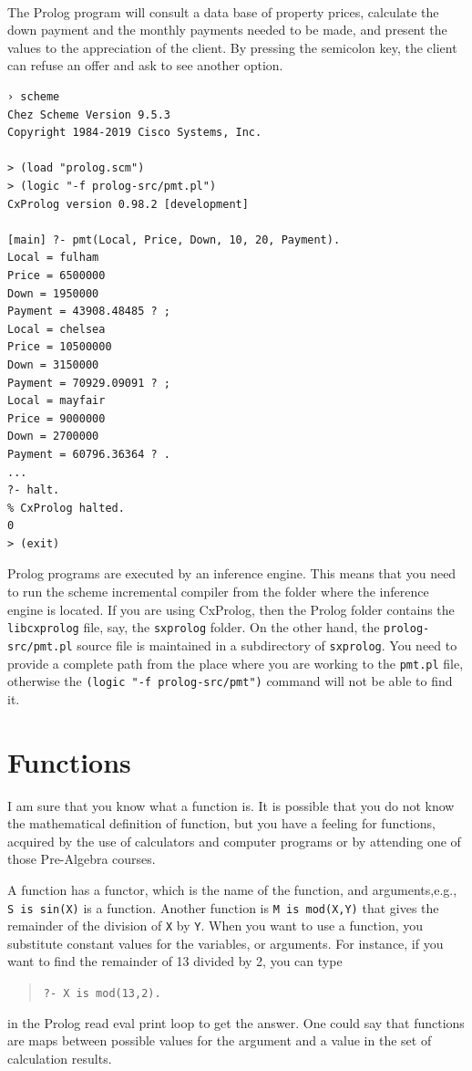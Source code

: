 \documentclass[a4paper,12pt]{book}
\begin{document}
\verb||\\
The Prolog program will consult a data base of
property prices, calculate the down payment and
the monthly payments needed to be made, and present the
values to the appreciation of the client. By pressing the
semicolon key, the client can refuse an offer and
ask to see another option.

\begin{verbatim}
› scheme
Chez Scheme Version 9.5.3
Copyright 1984-2019 Cisco Systems, Inc.

> (load "prolog.scm")
> (logic "-f prolog-src/pmt.pl")
CxProlog version 0.98.2 [development]

[main] ?- pmt(Local, Price, Down, 10, 20, Payment).
Local = fulham
Price = 6500000
Down = 1950000
Payment = 43908.48485 ? ;
Local = chelsea
Price = 10500000
Down = 3150000
Payment = 70929.09091 ? ;
Local = mayfair
Price = 9000000
Down = 2700000
Payment = 60796.36364 ? .
...
?- halt.
% CxProlog halted.
0
> (exit)
\end{verbatim}

Prolog programs are executed by an inference
engine. This means that you need to run the
scheme incremental compiler from the folder
where the inference engine is located. If you
are using CxProlog, then the Prolog folder
contains the \verb|libcxprolog| file, say,
the \verb|sxprolog| folder. On the other hand,
the \verb|prolog-src/pmt.pl| source file is
maintained in a subdirectory of \verb|sxprolog|.
You need to provide a complete path from the place
where you are working to the \verb|pmt.pl| file,
otherwise the \verb|(logic "-f prolog-src/pmt")|
command will not be able to find it.

\section{Functions}
I am sure that you know what a function is. It is
possible that you do not know the mathematical
definition of function, but you have a feeling
for functions, acquired by the use of calculators
and computer programs or by attending one of
those Pre-Algebra courses.

A function has a functor, which is the name of the
function, and arguments,e.g., \verb|S is sin(X)| is
a function. Another function is \verb|M is mod(X,Y)|
that gives the remainder of the division of \verb|X|
by \verb|Y|.  When you want to use a function, you
substitute constant values for the variables, or arguments.
For instance, if you want to find the remainder
of 13 divided by 2, you can type
\begin{quote}
	\verb|?- X is mod(13,2).|
\end{quote}
in the Prolog read eval print loop to get the
answer. One could say that functions are maps
between possible values for the argument and
a value in the set of calculation results.
\end{document}

